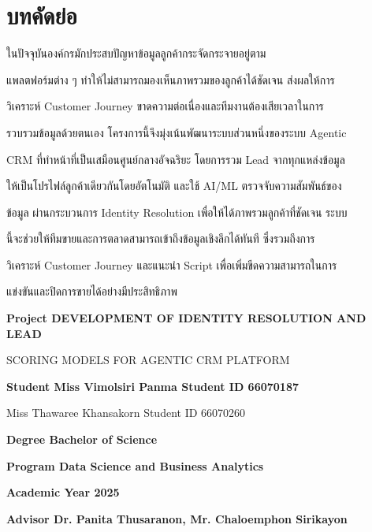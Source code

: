 \documentclass[12pt,a4paper]{report}
\begin{document}
\section*{บทคัดย่อ}
ในปัจจุบันองค์กรมักประสบปัญหาข้อมูลลูกค้ากระจัดกระจายอยู่ตาม\par
แพลตฟอร์มต่าง ๆ ทำให้ไม่สามารถมองเห็นภาพรวมของลูกค้าได้ชัดเจน ส่งผลให้การ\par
วิเคราะห์ Customer Journey ขาดความต่อเนื่องและทีมงานต้องเสียเวลาในการ\par
รวบรวมข้อมูลด้วยตนเอง โครงการนี้จึงมุ่งเน้นพัฒนาระบบส่วนหนึ่งของระบบ Agentic\par
CRM ที่ทำหน้าที่เป็นเสมือนศูนย์กลางอัจฉริยะ โดยการรวม Lead จากทุกแหล่งข้อมูล\par
ให้เป็นโปรไฟล์ลูกค้าเดียวกันโดยอัตโนมัติ และใช้ AI/ML ตรวจจับความสัมพันธ์ของ\par
ข้อมูล ผ่านกระบวนการ Identity Resolution เพื่อให้ได้ภาพรวมลูกค้าที่ชัดเจน ระบบ\par
นี้จะช่วยให้ทีมขายและการตลาดสามารถเข้าถึงข้อมูลเชิงลึกได้ทันที ซึ่งรวมถึงการ\par
วิเคราะห์ Customer Journey และแนะนำ Script เพื่อเพิ่มขีดความสามารถในการ\par
แข่งขันและปิดการขายได้อย่างมีประสิทธิภาพ\par
\clearpage
\begin{center}\bfseries Project DEVELOPMENT OF IDENTITY RESOLUTION AND LEAD\end{center}
SCORING MODELS FOR AGENTIC CRM PLATFORM\par
\begin{center}\bfseries Student Miss Vimolsiri Panma Student ID 66070187\end{center}
Miss Thawaree Khansakorn Student ID 66070260\par
\begin{center}\bfseries Degree Bachelor of Science\end{center}
\begin{center}\bfseries Program Data Science and Business Analytics\end{center}
\begin{center}\bfseries Academic Year 2025\end{center}
\begin{center}\bfseries Advisor Dr. Panita Thusaranon, Mr. Chaloemphon Sirikayon\end{center}
\end{document}
